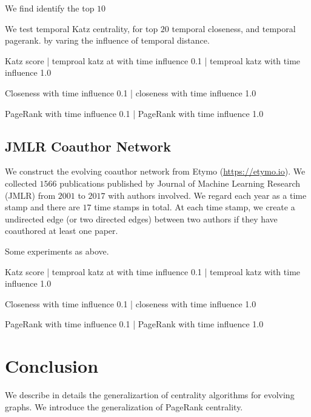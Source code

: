 \documentclass[12pt]{article}
\theoremstyle{definition}
\begin{document}
We find identify the top $10$

We test temporal Katz centrality,  for top $20$
temporal closeness, and temporal pagerank.
by varing the influence of temporal distance.



Katz score | temproal katz at with time influence 0.1 | temproal katz with time influence 1.0


Closeness with time influence 0.1 | closeness with time influence 1.0


PageRank with time influence 0.1 | PageRank with time influence 1.0



\subsection{JMLR Coauthor Network}
\label{sec:jmlr-coauth-netw}

We construct the evolving coauthor network from Etymo (\url{https://etymo.io}).
We collected $1566$ publications published by Journal of Machine Learning Research (JMLR) from $2001$ to $2017$ with authors involved. We regard each year
as a time stamp and there are $17$ time stamps in total. At each time stamp, we
create a undirected edge (or two directed edges) between two authors if they have coauthored at least one paper.

Some experiments as above.

Katz score | temproal katz at with time influence 0.1 | temproal katz with time influence 1.0


Closeness with time influence 0.1 | closeness with time influence 1.0


PageRank with time influence 0.1 | PageRank with time influence 1.0



\section{Conclusion}
\label{sec:conclusion}

We describe in details the generalizartion of centrality algorithms for evolving graphs.
We introduce the generalization of PageRank centrality.



\end{document}
